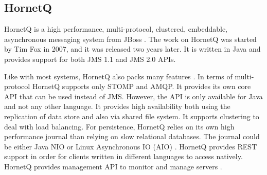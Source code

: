 \subsection{HornetQ}

HornetQ is a high performance, multi-protocol, clustered, embeddable, asynchronous messaging system from JBoss \parencite{giacomelli2012hornetq}. The work on HornetQ was started by Tim Fox in 2007, and it was released two years later. It is written in Java and provides support for both JMS 1.1 and JMS 2.0 APIs. 

Like with most systems, HornetQ also packs many features \parencite{hornetq_features}. In terms of multi-protocol HornetQ supports only STOMP and AMQP. It provides its own core API that can be used instead of JMS. However, the API is only available for Java and not any other language. It provides high availability both using the replication of data store and also via shared file system. It supports clustering to deal with load balancing. For persistence, HornetQ relies on its own high performance journal than relying on slow relational databases. The journal could be either Java NIO \parencite{hitchens2002java} or Linux Asynchronous IO (AIO) \parencite{bhattacharya2003asynchronous}. HornetQ provides REST support in order for clients written in different languages to access natively. HornetQ provides management API to monitor and manage servers \parencite{hornetq_official_site}.
